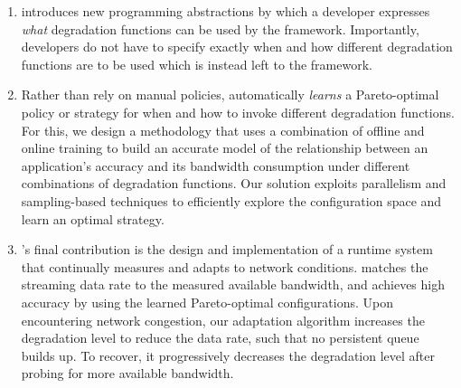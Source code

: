 \begin{enumerate}[leftmargin=*, topsep=3pt]
\item \sysname{} introduces new programming abstractions by which a developer
  expresses \emph{what} degradation functions can be used by the framework.
  Importantly, developers do not have to specify exactly when and how different
  degradation functions are to be used which is instead left to the \sysname{}
  framework.

\item Rather than rely on manual policies, \sysname{} automatically
  \emph{learns} a Pareto-optimal policy or strategy for when and how to invoke
  different degradation functions.  For this, we design a methodology that uses
  a combination of offline and online training to build an accurate model of the
  relationship between an application's accuracy and its bandwidth consumption
  under different combinations of degradation functions. Our solution exploits
  parallelism and sampling-based techniques to efficiently explore the
  configuration space and learn an optimal strategy.


\item \sysname{}'s final contribution is the design and implementation of a
  runtime system that continually measures and adapts to network conditions.
  \sysname{} matches the streaming data rate to the measured available
  bandwidth, and achieves high accuracy by using the learned Pareto-optimal
  configurations.  Upon encountering network congestion, our adaptation
  algorithm increases the degradation level to reduce the data rate, such that
  no persistent queue builds up. To recover, it progressively decreases the
  degradation level after probing for more available bandwidth.


\end{enumerate}
